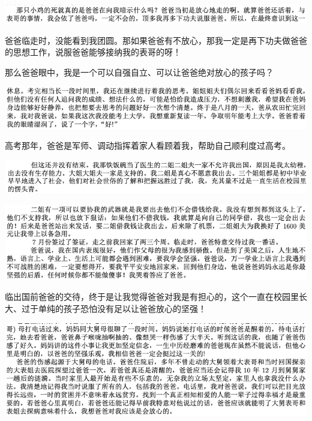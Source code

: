 \documentclass[9pt, b5paper]{article}
\begin{document}
\begin{center}
\includegraphics[width=.9\linewidth]{./pic/backups_plans_20210415_094055.png}
\end{center}

爸爸临走时，没能看到我团圆。那如果爸爸有不放心，那我一定是再下功夫做爸爸的思想工作，说服爸爸能够接纳我的表哥的呀！

那么爸爸眼中，我是一个可以自强自立、可以让爸爸绝对放心的孩子吗？

\begin{center}
\includegraphics[width=.9\linewidth]{./pic/backups_plans_20210415_100644.png}
\end{center}

高考那年，爸爸是军师、调动指挥着家人看顾着我，帮助自己顺利度过高考。 

\begin{center}
\includegraphics[width=.9\linewidth]{./pic/backups_plans_20210415_100910.png}
\end{center}

\begin{center}
\includegraphics[width=.9\linewidth]{./pic/backups_plans_20210415_100926.png}
\end{center}

临出国前爸爸的交待，终于是让我觉得爸爸对我是有担心的，这个一直在校园里长大、过于单纯的孩子恐怕没有足以让爸爸放心的坚强！

\begin{center}
\includegraphics[width=.9\linewidth]{./pic/backups_plans_20210415_131810.png}
\end{center}
\end{document}

